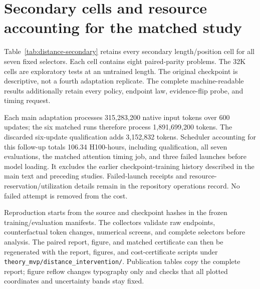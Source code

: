 \section{Secondary cells and resource accounting for the matched study}
\label{app:distance-supplement}
Table~\ref{tab:distance-secondary} retains every secondary length/position
cell for all seven fixed selectors. Each cell contains eight paired-parity
problems. The 32K cells are exploratory tests at an untrained length.
The original checkpoint is descriptive, not a fourth adaptation replicate.
The complete machine-readable results additionally retain every policy,
endpoint law, evidence-flip probe, and timing request.

\begin{table}[h]
\centering\small
\caption{Secondary information-set KL (nats). Seed suffixes 11, 12, 13 denote
20271011, 20271012, 20271013. No cell is removed by a competence gate.
These eight-problem cells are separate from the 32-problem 16K primary panel.}
\resizebox{\linewidth}{!}{}
\label{tab:distance-secondary}
\end{table}

Each main adaptation processes 315,283,200 native input tokens over 600 updates;
the six matched runs therefore process 1,891,699,200 tokens.
The discarded six-update qualification adds 3,152,832 tokens. Scheduler
accounting for this follow-up totals 106.34 H100-hours, including qualification,
all seven evaluations, the matched attention timing job, and three failed
launches before model loading. It excludes the earlier checkpoint-training
history described in the main text and preceding studies.
Failed-launch receipts and resource-reservation/utilization details remain in
the repository operations record. No failed attempt is removed from the cost.

Reproduction starts from the source and checkpoint hashes in the frozen
training/evaluation manifests. The collectors validate raw endpoints,
counterfactual token changes, numerical screens, and complete selectors before
analysis. The paired report, figure, and matched certificate can then be
regenerated with the report, figures, and cost-certificate scripts under
\texttt{theory\_mvp/distance\_intervention/}.
Publication tables copy the complete report; figure reflow changes typography
only and checks that all plotted coordinates and uncertainty bands stay fixed.
